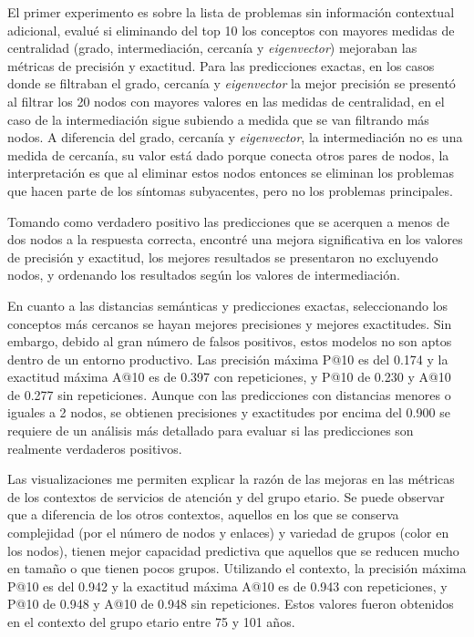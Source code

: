 El primer experimento es sobre la lista de problemas sin información contextual adicional, evalué si eliminando del top 10 los conceptos con mayores medidas de centralidad (grado, intermediación, cercanía y \textit{eigenvector}) mejoraban las métricas de precisión y exactitud. Para las predicciones exactas, en los casos donde se filtraban el grado, cercanía y \textit{eigenvector} la mejor precisión se presentó al filtrar los 20 nodos con mayores valores en las medidas de centralidad, en el caso de la intermediación sigue subiendo a medida que se van filtrando más nodos. A diferencia del grado, cercanía y \textit{eigenvector}, la intermediación no es una medida de cercanía, su valor está dado porque conecta otros pares de nodos, la interpretación es que al eliminar estos nodos entonces se eliminan los problemas que hacen parte de los síntomas subyacentes, pero no los problemas principales.

Tomando como verdadero positivo las predicciones que se acerquen a menos de dos nodos a la respuesta correcta, encontré una mejora significativa en los valores de precisión y exactitud, los mejores resultados se presentaron no excluyendo nodos, y ordenando los resultados según los valores de intermediación.

En cuanto a las distancias semánticas y predicciones exactas, seleccionando los conceptos más cercanos se hayan mejores precisiones y mejores exactitudes. Sin embargo, debido al gran número de falsos positivos, estos modelos no son aptos dentro de un entorno productivo. Las precisión máxima P@10 es del \num{0.174} y la exactitud máxima A@10 es de \num{0.397} con repeticiones, y  P@10 de \num{0.230} y A@10 de \num{0.277} sin repeticiones. Aunque con las predicciones con distancias menores o iguales a 2 nodos, se obtienen precisiones y exactitudes por encima del \num{0.900} se requiere de un análisis más detallado para evaluar si las predicciones son realmente verdaderos positivos. 

Las visualizaciones me permiten explicar la razón de las mejoras en las métricas de los contextos de servicios de atención y del grupo etario. Se puede observar que a diferencia de los otros contextos, aquellos en los que se conserva complejidad (por el número de nodos y enlaces) y variedad de grupos (color en los nodos), tienen mejor capacidad predictiva que aquellos que se reducen mucho en tamaño o que tienen pocos grupos. Utilizando el contexto, la precisión máxima P@10 es del \num{0.942} y la exactitud máxima A@10 es de \num{0.943} con repeticiones, y  P@10 de \num{0.948} y A@10 de \num{0.948} sin repeticiones. Estos valores fueron obtenidos en el contexto del grupo etario entre 75 y 101 años.

